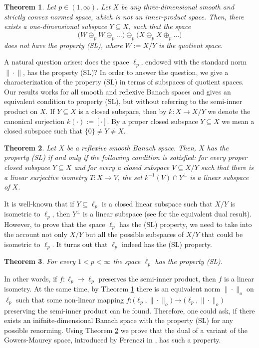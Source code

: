\documentclass[12pt, reqno]{amsart}
\newtheorem{theorem}{Theorem}[section]
\theoremstyle{definition}
\theoremstyle{remark}
\numberwithin{equation}{section}
\begin{document}
\begin{theorem}
\label{twkonstrukcja}
Let $p\in (1,\infty)$. Let $X$ be any three-dimensional smooth and strictly convex normed space, which is not an inner-product space. Then, there exists a one-dimensional subspace $Y \subseteq X$, such that the space
$$\Big(W\oplus_p W \oplus_p\ldots\Big)\oplus_p\Big(X\oplus_p X\oplus_p\ldots\Big)$$
does not have the property (SL), where $W:= X/Y$ is the quotient space.
\end{theorem}

A natural question arises: does the space $\ell_p$, endowed with the standard norm $\|\!\cdot\!\|$, has the property (SL)? In order to answer the question, we give a characterization of the property (SL) in terms of subspaces of quotient spaces. Our results works for all smooth and reflexive Banach spaces and gives an equivalent condition to property (SL), but without referring to the semi-inner product on $X$. If $Y \subseteq X$ is a closed subspace, then by $k\colon X \to X/Y $ we denote the canonical surjection $k(\cdot):=[\cdot]$. By a proper closed
subspace $Y \subseteq X$ we mean a closed subspace such that $\{0\}\neq Y \neq X$.
\begin{theorem}
\label{twchar}
Let $X$ be a reflexive smooth Banach space. Then, $X$ has the property (SL) if and only if the following condition is satisfied: for every proper closed subspace $Y \subseteq X$ and for every a closed subspace $V\subseteq X/Y$ such that there is a linear surjective isometry $T\colon X \to V$, the set $k^{-1}(V) \cap Y^{\perp}$ is a linear subspace of $X$.
\end{theorem}
It is well-known that if $Y \subseteq \ell_p$ is a closed linear subspace such that $X/Y$ is isometric to $\ell_p$, then $Y^{\perp}$ is a linear subspace (see \cite{pelczynski} for the equivalent dual result). However, to prove that the space $\ell_p$ has the (SL) property, we need to take into the account not only $X/Y$ but all the possible subspaces of $X/Y$ that could be isometric to $\ell_p$.
It turns out that $\ell_p$ indeed has the (SL) property.
\begin{theorem}
\label{twlp}
For every $1 < p < \infty$ the space $\ell_p$ has the property (SL).
\end{theorem}
In other words, if $f: \ell_p \to \ell_p$ preserves the semi-inner product, then $f$ is a linear isometry. At the same time, by Theorem \ref{twkonstrukcja} there is an equivalent norm
$\|\!\cdot\!\|_o$ on $\ell_p$ such that some non-linear mapping $f\colon \big(\ell_p,\|\!\cdot\!\|_o\big)\to \big(\ell_p,\|\!\cdot\!\|_o\big)$ preserving the semi-inner product can be found. Therefore, one could ask, if there exists an inifnite-dimensional Banach space with the property (SL) for any possible renorming. Using Theorem \ref{twchar} we prove that the dual of a variant of the Gowers-Maurey space, introduced by Ferenczi in \cite{ferencziconvex}, has such a property.
\end{document}

